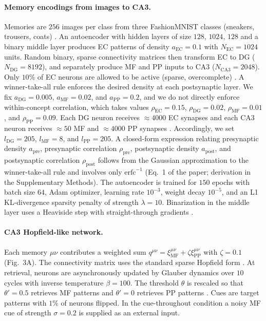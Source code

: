\documentclass[11pt]{article}
\begin{document}
\paragraph{Memory encodings from images to CA3.} Memories are $256$ images per class from three FashionMNIST classes (sneakers, trousers, coats) \cite{xiao2017fashionmnist}. An autoencoder with hidden layers of size $128$, $1024$, $128$ and a binary middle layer produces EC patterns of density $a_{\mathrm{EC}} = 0.1$ with $N_{\mathrm{EC}} = 1024$ units. Random binary, sparse connectivity matrices then transform EC to DG ($N_{\mathrm{DG}} = 8192$), and separately produce MF and PP inputs to CA3 ($N_{\mathrm{CA3}} = 2048$). Only $10\%$ of EC neurons are allowed to be active (sparse, overcomplete) \cite{olshausen1996,makhzani2014}. A winner-take-all rule enforces the desired density at each postsynaptic layer. We fix $a_{\mathrm{DG}} = 0.005$, $a_{\mathrm{MF}} = 0.02$, and $a_{\mathrm{PP}} = 0.2$, and we do not directly enforce within-concept correlation, which takes values $\rho_{\mathrm{EC}} = 0.15$, $\rho_{\mathrm{DG}} = 0.02$, $\rho_{\mathrm{MF}} = 0.01$, and $\rho_{\mathrm{PP}} = 0.09$. Each DG neuron receives $\approx 4000$ EC synapses and each CA3 neuron receives $\approx 50$ MF and $\approx 4000$ PP synapses \cite{amaral1990}. Accordingly, we set $l_{\mathrm{DG}} = 205$, $l_{\mathrm{MF}} = 8$, and $l_{\mathrm{PP}} = 205$. A closed-form expression relating presynaptic density $a_{\mathrm{pre}}$, presynaptic correlation $\rho_{\mathrm{pre}}$, postsynaptic density $a_{\mathrm{post}}$, and postsynaptic correlation $\rho_{\mathrm{post}}$ follows from the Gaussian approximation to the winner-take-all rule and involves only $\mathrm{erfc}^{-1}$ (Eq.~1 of the paper; derivation in the Supplementary Methods). The autoencoder is trained for $150$ epochs with batch size $64$, Adam optimizer, learning rate $10^{-3}$, weight decay $10^{-5}$, and an L1 KL-divergence sparsity penalty of strength $\lambda = 10$. Binarization in the middle layer uses a Heaviside step with straight-through gradients \cite{bengio2013ste}.

\paragraph{CA3 Hopfield-like network.} Each memory $\mu\nu$ contributes a weighted sum $q^{\mu\nu} = \xi^{\mu\nu}_{\mathrm{MF}} + \zeta \xi^{\mu\nu}_{\mathrm{PP}}$ with $\zeta = 0.1$ (Fig.~3A). The connectivity matrix uses the standard sparse Hopfield form \cite{tsodyks1988}. At retrieval, neurons are asynchronously updated by Glauber dynamics \cite{amit1985} over $10$ cycles with inverse temperature $\beta = 100$. The threshold $\theta$ is rescaled so that $\theta' = 0.5$ retrieves MF patterns and $\theta' = 0$ retrieves PP patterns \cite{kang2023}. Cues are target patterns with $1\%$ of neurons flipped. In the cue-throughout condition a noisy MF cue of strength $\sigma = 0.2$ is supplied as an external input.
\end{document}
